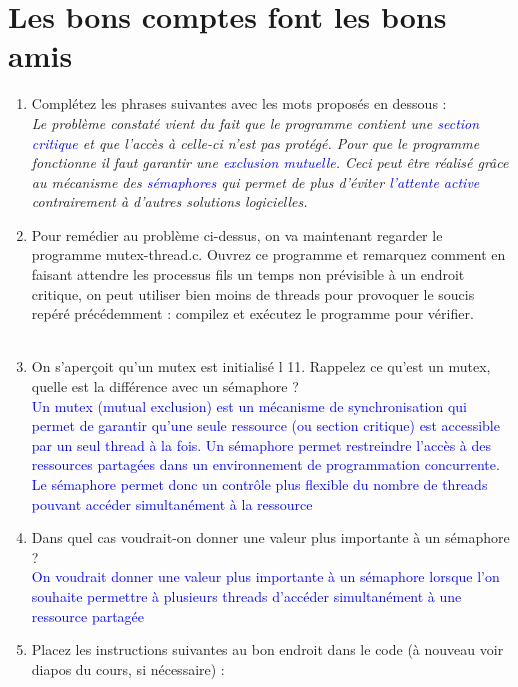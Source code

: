 \documentclass{article}
\begin{document}
	\section{Les bons comptes font les bons amis}
	\begin{enumerate}
		\item Complétez les phrases suivantes avec les mots proposés en dessous : \\
			\textit{Le problème constaté vient du fait que le programme contient une \textcolor{blue}{section critique}
			et que l’accès à celle-ci n’est pas protégé. Pour que le programme fonctionne il faut
			garantir une \textcolor{blue}{exclusion mutuelle}. Ceci peut être réalisé grâce au mécanisme
			des \textcolor{blue}{sémaphores} qui permet de plus d’éviter \textcolor{blue}{l'attente active}
			contrairement à d’autres solutions logicielles.}\\
		\item Pour remédier au problème ci-dessus, on va maintenant regarder le programme
		mutex-thread.c. Ouvrez ce programme et remarquez comment en faisant attendre
		les processus fils un temps non prévisible à un endroit critique, on peut utiliser bien
		moins de threads pour provoquer le soucis repéré précédemment : compilez et
		exécutez le programme pour vérifier. \\
			\textcolor{blue}{}\\
		\item On s'aperçoit qu'un mutex est initialisé l 11. Rappelez ce qu'est un mutex, quelle est la différence avec un sémaphore ? \\
			\textcolor{blue}{Un mutex (mutual exclusion) est un mécanisme de synchronisation qui permet de garantir qu'une seule ressource (ou section critique) est accessible par un seul thread à la fois. Un sémaphore permet restreindre l'accès à des ressources partagées dans un environnement de programmation concurrente. Le sémaphore permet donc un contrôle plus flexible du nombre de threads pouvant accéder simultanément à la ressource}\\
		\item Dans quel cas voudrait-on donner une valeur plus importante à un sémaphore ? \\
			\textcolor{blue}{On voudrait donner une valeur plus importante à un sémaphore lorsque l'on souhaite permettre à plusieurs threads d'accéder simultanément à une ressource partagée}\\
		\item Placez les instructions suivantes au bon endroit dans le code (à nouveau voir diapos du cours, si nécessaire) : \\

\end{enumerate}
\end{document}
